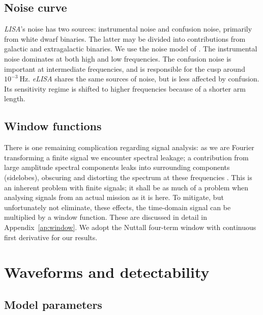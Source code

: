 \documentclass[useAMS,usedcolumn,usegraphicx,usenatbib]{mn2e}
\newcommand{\apref}[1]{Appendix~\ref{ap:#1}}
\newcommand{\units}[1]{\ensuremath{~\mathrm{#1}}}
\begin{document}
\subsection{Noise curve}\label{sec:Noise}

\textit{LISA}'s noise has two sources: instrumental noise and confusion noise, primarily from white dwarf binaries. The latter may be divided into contributions from galactic and extragalactic binaries. We use the noise model of \citet{Barack2004}. The instrumental noise dominates at both high and low frequencies. The confusion noise is important at intermediate frequencies, and is responsible for the cusp around $10^{-3}\units{Hz}$. \textit{eLISA} shares the same sources of noise, but is less affected by confusion. Its sensitivity regime is shifted to higher frequencies because of a shorter arm length.

\subsection{Window functions}

There is one remaining complication regarding signal analysis: as we are Fourier transforming a finite signal we encounter spectral leakage; a contribution from large amplitude spectral components leaks into surrounding components (sidelobes), obscuring and distorting the spectrum at these frequencies \citep{Harris1978}. This is an inherent problem with finite signals; it shall be as much of a problem when analysing signals from an actual mission as it is here. To mitigate, but unfortunately not eliminate, these effects, the time-domain signal can be multiplied by a window function. These are discussed in detail in \apref{window}. We adopt the Nuttall four-term window with continuous first derivative \citep{Nuttall1981} for our results.

\section{Waveforms and detectability}\label{sec:Waveforms}

\subsection{Model parameters}
\end{document}
